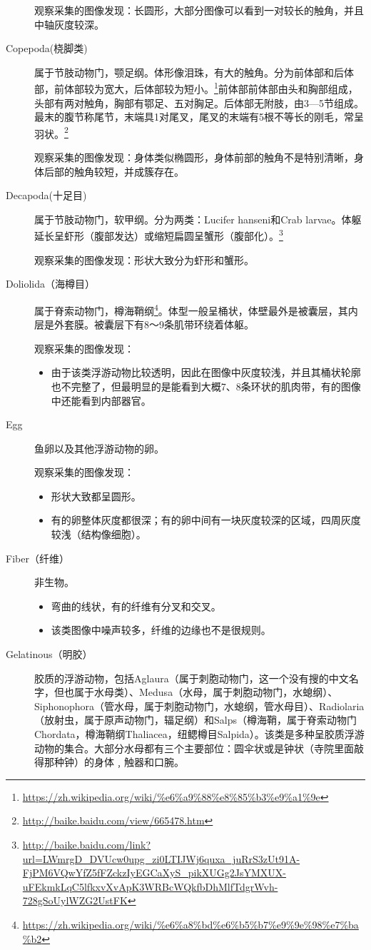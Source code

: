 \begin{description}
    观察采集的图像发现：长圆形，大部分图像可以看到一对较长的触角，并且中轴灰度较深。
    \item[{\color{blue}Copepoda(桡脚类)}] 属于节肢动物门，颚足纲。体形像泪珠，有大的触角。分为前体部和后体部，前体部较为宽大，后体部较为短小。\footnote{\url{https://zh.wikipedia.org/wiki/\%e6\%a9\%88\%e8\%85\%b3\%e9\%a1\%9e}}前体部前体部由头和胸部组成，头部有两对触角，胸部有鄂足、五对胸足。后体部无附肢，由3—5节组成。最末的腹节称尾节，末端具1对尾叉，尾叉的末端有5根不等长的刚毛，常呈羽状。\footnote{\url{http://baike.baidu.com/view/665478.htm}}
    
    观察采集的图像发现：身体类似椭圆形，身体前部的触角不是特别清晰，身体后部的触角较短，并成簇存在。
    \item[{\color{blue}Decapoda(十足目)}] 属于节肢动物门，软甲纲。分为两类：Lucifer hanseni和Crab larvae。体躯延长呈虾形（腹部发达）或缩短扁圆呈蟹形（腹部化）。\footnote{\url{http://baike.baidu.com/link?url=LWmrgD_DVUcw0upg_zi0LTIJWj6quxa_juRrS3zUt91A-FjPM6VQwYfZ5fFZckzIyEGCaXyS_pikXUGg2JsYMXUX-uFEkmkLqC5lfkxvXvApK3WRBcWQkfbDhMlfTdgrWvh-728gSoUylWZG2UstFK}}
    
    观察采集的图像发现：形状大致分为虾形和蟹形。
    \item[Doliolida（海樽目）] 属于脊索动物门，樽海鞘纲\footnote{\url{https://zh.wikipedia.org/wiki/\%e6\%a8\%bd\%e6\%b5\%b7\%e9\%9e\%98\%e7\%ba\%b2}}。体型一般呈桶状，体壁最外是被囊层，其内层是外套膜。被囊层下有8～9条肌带环绕着体躯。
    
    观察采集的图像发现：
        \begin{itemize}
        \item 由于该类浮游动物比较透明，因此在图像中灰度较浅，并且其桶状轮廓也不完整了，但最明显的是能看到大概7、8条环状的肌肉带，有的图像中还能看到内部器官。
        \end{itemize}
    \item[{\color{blue}Egg}] 鱼卵以及其他浮游动物的卵。
    
    观察采集的图像发现：
        \begin{itemize}
        \item 形状大致都呈圆形。
        \item 有的卵整体灰度都很深；有的卵中间有一块灰度较深的区域，四周灰度较浅（结构像细胞）。
        \end{itemize}
    \item[Fiber（纤维）] 非生物。
        \begin{itemize}
        \item 弯曲的线状，有的纤维有分叉和交叉。
        \item 该类图像中噪声较多，纤维的边缘也不是很规则。
        \end{itemize}
    \item[Gelatinous（明胶）] 胶质的浮游动物，包括Aglaura（属于刺胞动物门，这一个没有搜的中文名字，但也属于水母类）、Medusa（水母，属于刺胞动物门，水螅纲）、Siphonophora（管水母，属于刺胞动物门，水螅纲，管水母目）、Radiolaria（放射虫，属于原声动物门，辐足纲）和Salps（樽海鞘，属于脊索动物门Chordata，樽海鞘纲Thaliacea，纽鳃樽目Salpida）。该类是多种呈胶质浮游动物的集合。大部分水母都有三个主要部位：圆伞状或是钟状（寺院里面敲得那种钟）的身体﹐触器和口腕。
    

\end{description}
